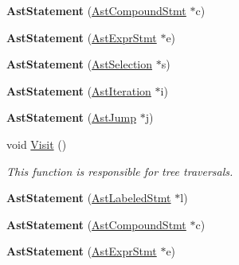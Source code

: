 \begin{DoxyCompactItemize}
\item 
\hypertarget{classAstStatement_a06ab5906e58059421ffca709140ad1b0}{{\bfseries Ast\-Statement} (\hyperlink{classAstCompoundStmt}{Ast\-Compound\-Stmt} $\ast$c)}\label{classAstStatement_a06ab5906e58059421ffca709140ad1b0}

\item 
\hypertarget{classAstStatement_a8a44969c79b381d9cef932fc93d99339}{{\bfseries Ast\-Statement} (\hyperlink{classAstExprStmt}{Ast\-Expr\-Stmt} $\ast$e)}\label{classAstStatement_a8a44969c79b381d9cef932fc93d99339}

\item 
\hypertarget{classAstStatement_a8bc036f0b37cacbfa99159e4c57207ec}{{\bfseries Ast\-Statement} (\hyperlink{classAstSelection}{Ast\-Selection} $\ast$s)}\label{classAstStatement_a8bc036f0b37cacbfa99159e4c57207ec}

\item 
\hypertarget{classAstStatement_ae26acf207adc2d426e558e5889b43b54}{{\bfseries Ast\-Statement} (\hyperlink{classAstIteration}{Ast\-Iteration} $\ast$i)}\label{classAstStatement_ae26acf207adc2d426e558e5889b43b54}

\item 
\hypertarget{classAstStatement_a80c754bbc909f7e2e7938e90485d7065}{{\bfseries Ast\-Statement} (\hyperlink{classAstJump}{Ast\-Jump} $\ast$j)}\label{classAstStatement_a80c754bbc909f7e2e7938e90485d7065}

\item 
void \hyperlink{classAstStatement_a1f1570931e373fe2f1e18ce417236ee4}{Visit} ()
\begin{DoxyCompactList}\small\item\em This function is responsible for tree traversals. \end{DoxyCompactList}\item 
\hypertarget{classAstStatement_a51c4738b3eb4d0ce7f7937580827df49}{{\bfseries Ast\-Statement} (\hyperlink{classAstLabeledStmt}{Ast\-Labeled\-Stmt} $\ast$l)}\label{classAstStatement_a51c4738b3eb4d0ce7f7937580827df49}

\item 
\hypertarget{classAstStatement_a06ab5906e58059421ffca709140ad1b0}{{\bfseries Ast\-Statement} (\hyperlink{classAstCompoundStmt}{Ast\-Compound\-Stmt} $\ast$c)}\label{classAstStatement_a06ab5906e58059421ffca709140ad1b0}

\item 
\hypertarget{classAstStatement_a8a44969c79b381d9cef932fc93d99339}{{\bfseries Ast\-Statement} (\hyperlink{classAstExprStmt}{Ast\-Expr\-Stmt} $\ast$e)}\label{classAstStatement_a8a44969c79b381d9cef932fc93d99339}


\end{DoxyCompactItemize}

